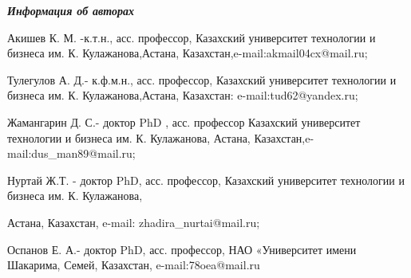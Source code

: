 \emph{{\bfseries Информация об авторах}}

Акишев К. М. -к.т.н., асс. профессор, Казахский университет технологии и
бизнеса им. К. Кулажанова,Астана, Казахстан,e-mail:akmail04cx@mail.ru;

Тулегулов А. Д.- к.ф.м.н., асс. профессор, Казахский университет
технологии и бизнеса им. К. Кулажанова,Астана, Казахстан:
e-mail:tud62@yandex.ru;

Жамангарин Д. С.- доктор PhD , асс. профессор Казахский университет
технологии и бизнеса им. К. Кулажанова, Астана,
Казахстан,e-mail:dus\_man89@mail.ru;

Нуртай Ж.Т. - доктор PhD, асс. профессор, Казахский университет
технологии и бизнеса им. К. Кулажанова,

Астана, Казахстан, e-mail: zhadira\_nurtai@mail.ru;

Оспанов Е. А.- доктор PhD, асс. профессор, НАО «Университет имени
Шакарима, Семей, Казахстан, e-mail:78oea@mail.ru\newpage